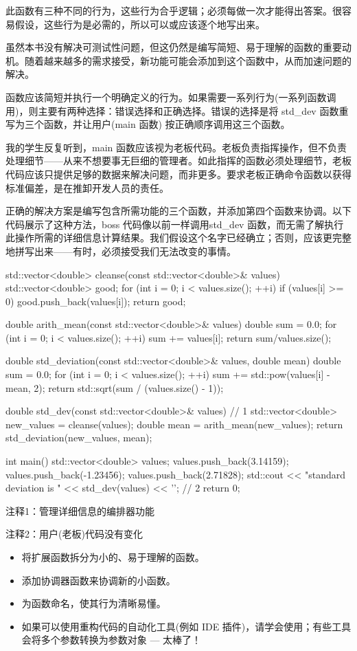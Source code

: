此函数有三种不同的行为，这些行为合乎逻辑；必须每做一次才能得出答案。很容易假设，这些行为是必需的，所以可以或应该逐个地写出来。

虽然本书没有解决可测试性问题，但这仍然是编写简短、易于理解的函数的重要动机。随着越来越多的需求接受，新功能可能会添加到这个函数中，从而加速问题的解决。


函数应该简短并执行一个明确定义的行为。如果需要一系列行为(一系列函数调用)，则主要有两种选择：错误选择和正确选择。错误的选择是将 std\_dev 函数重写为三个函数，并让用户(main 函数) 按正确顺序调用这三个函数。

我的学生反复听到，main 函数应该视为老板代码。老板负责指挥操作，但不负责处理细节——从来不想要事无巨细的管理者。如此指挥的函数必须处理细节，老板代码应该只提供足够的数据来解决问题，而非更多。要求老板正确命令函数以获得标准偏差，是在推卸开发人员的责任。

正确的解决方案是编写包含所需功能的三个函数，并添加第四个函数来协调。以下代码展示了这种方法，boss 代码像以前一样调用std\_dev 函数，而无需了解执行此操作所需的详细信息计算结果。我们假设这个名字已经确立；否则，应该更完整地拼写出来——有时，必须接受我们无法改变的事情。


\begin{cpp}
std::vector<double> cleanse(const std::vector<double>& values) {
  std::vector<double> good;
  for (int i = 0; i < values.size(); ++i)
    if (values[i] >= 0)
      good.push_back(values[i]);
  return good;
}

double arith_mean(const std::vector<double>& values) {
  double sum = 0.0;
  for (int i = 0; i < values.size(); ++i)
    sum += values[i];
  return sum/values.size();
}

double std_deviation(const std::vector<double>& values, double mean) {
  double sum = 0.0;
  for (int i = 0; i < values.size(); ++i)
    sum += std::pow(values[i] - mean, 2);
  return std::sqrt(sum / (values.size() - 1));
}

double std_dev(const std::vector<double>& values) { // 1
  std::vector<double> new_values = cleanse(values);
  double mean = arith_mean(new_values);
  return std_deviation(new_values, mean);
}

int main() {
  std::vector<double> values;
  values.push_back(3.14159);
  values.push_back(-1.23456);
  values.push_back(2.71828);
  std::cout << "standard deviation is " <<
    std_dev(values) << '\n'; // 2
  return 0;
}
\end{cpp}

{\footnotesize
注释1：管理详细信息的编排器功能

注释2：用户(老板)代码没有变化
}


\begin{itemize}
\item
将扩展函数拆分为小的、易于理解的函数。

\item
添加协调器函数来协调新的小函数。

\item
为函数命名，使其行为清晰易懂。

\item
如果可以使用重构代码的自动化工具(例如 IDE 插件)，请学会使用；有些工具会将多个参数转换为参数对象 — 太棒了！
\end{itemize}


